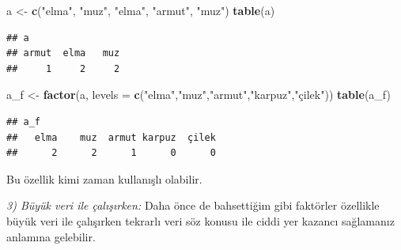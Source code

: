 \documentclass[
]{book}
\newenvironment{Shaded}{\begin{snugshade}}{\end{snugshade}}
\newcommand{\DataTypeTok}[1]{\textcolor[rgb]{0.13,0.29,0.53}{#1}}
\newcommand{\KeywordTok}[1]{\textcolor[rgb]{0.13,0.29,0.53}{\textbf{#1}}}
\newcommand{\NormalTok}[1]{#1}
\newcommand{\StringTok}[1]{\textcolor[rgb]{0.31,0.60,0.02}{#1}}
\begin{document}
\begin{Shaded}
\begin{Highlighting}[]
\NormalTok{a <{-}}\StringTok{  }\KeywordTok{c}\NormalTok{(}\StringTok{"elma"}\NormalTok{, }\StringTok{"muz"}\NormalTok{, }\StringTok{"elma"}\NormalTok{, }\StringTok{"armut"}\NormalTok{, }\StringTok{"muz"}\NormalTok{)}
\KeywordTok{table}\NormalTok{(a)}
\end{Highlighting}
\end{Shaded}

\begin{verbatim}
## a
## armut  elma   muz 
##     1     2     2
\end{verbatim}

\begin{Shaded}
\begin{Highlighting}[]
\NormalTok{a\_f <{-}}\StringTok{ }\KeywordTok{factor}\NormalTok{(a, }\DataTypeTok{levels =} \KeywordTok{c}\NormalTok{(}\StringTok{"elma"}\NormalTok{,}\StringTok{"muz"}\NormalTok{,}\StringTok{"armut"}\NormalTok{,}\StringTok{"karpuz"}\NormalTok{,}\StringTok{"çilek"}\NormalTok{))}
\KeywordTok{table}\NormalTok{(a\_f)}
\end{Highlighting}
\end{Shaded}

\begin{verbatim}
## a_f
##   elma    muz  armut karpuz  çilek 
##      2      2      1      0      0
\end{verbatim}

Bu özellik kimi zaman kullanışlı olabilir.

\emph{3) Büyük veri ile çalışırken:} Daha önce de bahsettiğim gibi faktörler özellikle büyük veri ile çalışırken tekrarlı veri söz konusu ile ciddi yer kazancı sağlamanız anlamına gelebilir.

  
\end{document}
